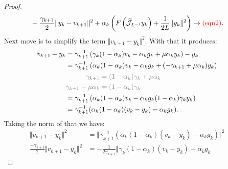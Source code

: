 \documentclass[12pt]{article}
\begin{document}
\begin{proof}
\begin{align*}
            & \quad 
            - \frac{\gamma_{k + 1}}{2}\Vert y_k - v_{k + 1}\Vert^2 
            + 
            \alpha_k\left(
                F\left(\widetilde{\mathcal J}_{L^{-1}} y_k\right) 
                + 
                \frac{1}{2L} \Vert g_k\Vert^2
            \right)
            \rightarrow 
            \textcolor{red}{(\text{eqn2})}. 
        \end{align*}
        Next move is to simplify the term $\Vert v_{k + 1} - y_k\Vert^2$. 
        With that it produces: 
        \begin{align*}
            v_{k + 1} - y_k 
            &= 
            \gamma_{k + 1}^{-1}
            \left(
                \gamma_k(1 - \alpha_k) v_k - \alpha_k g_k + \mu \alpha_k y_k
            \right) - y_k
            \\
            &= 
            \gamma_{k + 1}^{-1}
            \left(
                \alpha_k(1 - \alpha_k)v_k - \alpha_k g_k 
                + (-\gamma_{k + 1} + \mu\alpha_k)y_k
            \right)
            \\
            &
            \textcolor{gray}{
                \begin{aligned}
                    \gamma_{k + 1} &=    
                    (1 - \alpha_k)\gamma_k + \mu \alpha_k
                    \\
                    \gamma_{k + 1} - \mu \alpha_k &= (1 - \alpha_k)\gamma_k
                \end{aligned}
            }
            \\
            &=
            \gamma_{k + 1}^{-1}
            \left(
                \alpha_k(1 - \alpha_k)v_k - \alpha_k g_k 
                (1 - \alpha_k)\gamma_ky_k
            \right)
            \\
            &= 
            \gamma_{k + 1}^{-1}(
                \alpha_k(1 - \alpha_k)(v_k - y_k) 
                - \alpha_k g_k
            ).
        \end{align*}
        Taking the norm of that we have: 
        \begin{align*}
            \Vert v_{k + 1} - y_k\Vert^2 
            &= 
            \Vert 
                \gamma_{k + 1}^{-1}(
                    \alpha_k(1 - \alpha_k)(v_k - y_k) 
                    - \alpha_k g_k
                )
            \Vert^2
            \\
            \frac{- \gamma_{k + 1}}{2}
            \Vert v_{k + 1} - y_k\Vert^2
            &= 
            - \frac{1}{2\gamma_{k + 1}}
            \Vert 
                \gamma_k(1 - \alpha_k)(v_k - y_k) - \alpha_k g_k

\end{align*}
\end{proof}
\end{document}
